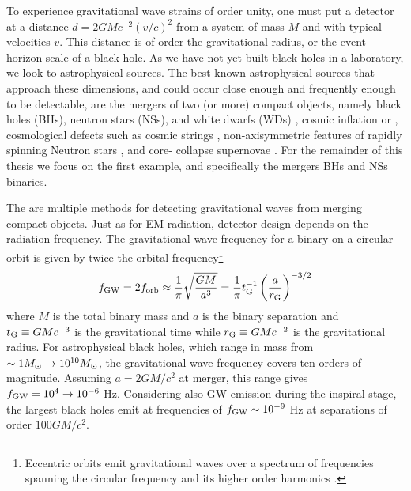 To experience gravitational wave strains of order unity, one must put a
detector at a distance $d= 2GMc^{-2} (v/c)^2$ from a system of mass $M$ and
with typical velocities $v$. This distance is of order the gravitational
radius, or the event horizon scale of a black hole. As we have not yet built
black holes in a laboratory, we look to astrophysical sources. The best known
astrophysical sources that approach these dimensions, and could occur close
enough and frequently enough to be detectable, are the mergers of two (or
more) compact objects, namely black holes (BHs), neutron stars (NSs), and
white dwarfs (WDs) \citep[\textit{e.g.}][]{ThorneBraginsky:1976,
ClarkeErdley:1977, Belczynski:2016}, cosmic inflation \citep{Starobinski:1979}
or \citep[\textit{e.g.}][for a recent review]{Guzzetti:2016}, cosmological
defects such as cosmic strings \citep[\textit{e.g.}][and references
therein]{Damour:2005},  non-axisymmetric features of rapidly spinning Neutron
stars \citep[\textit{e.g.}][and references therein]{Haskell:2015}, and core-
collapse supernovae \citep[\textit{e.g.}][and references
therein]{FryerNew:2003:LRR}.  For the remainder of this thesis we focus on the
first example, and specifically  the mergers BHs and NSs binaries.

The are multiple methods for detecting gravitational waves from merging
compact objects. Just as for EM radiation, detector design depends on the
radiation frequency. The gravitational wave frequency for a binary on a
circular orbit is given by twice the orbital frequency\footnote{Eccentric
orbits emit gravitational waves over a spectrum of frequencies spanning the
circular frequency and its higher order harmonics \citep[\textit{e.g.}][]{Enoki:2007}.} 
\begin{equation}
f_{\rm{GW}} = 2 f_{\rm{orb}} \approx  \frac{1}{\pi} \sqrt{\frac{G M }{a^3}} =
\frac{1}{\pi} t^{-1}_{\rm{G}} \left( \frac{a}{r_{\rm{G}}} \right)^{-3/2}
\label{Eq:GWfreq}
\end{equation} 
where $M$ is the total binary mass and $a$ is the binary
separation and $t_{\rm{G}} \equiv GMc^{-3}$ is the gravitational time while
$r_{\rm{G}} \equiv GMc^{-2}$ is the gravitational radius.  For astrophysical
black holes, which range in mass from $\sim 1 {M_{\odot}} \rightarrow 10^{10}
{M_{\odot}}$, the gravitational wave frequency covers ten orders of magnitude.
Assuming $a = 2GM/c^2$ at merger, this range gives $f_{\rm{GW}} = 10^4 \rightarrow
10^{-6}$ Hz. Considering also GW emission during the inspiral stage, the
largest black holes emit at frequencies of $f_{\rm{GW}} \sim 10^{-9}$ Hz at
separations of order $100 GM/c^2$.

